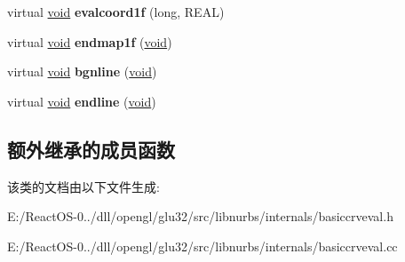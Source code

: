 \begin{DoxyCompactItemize}
virtual \hyperlink{interfacevoid}{void} {\bfseries evalcoord1f} (long, R\+E\+AL)
\item 
\mbox{\label{class_basic_curve_evaluator_a00b86103abe2972929dc866bbbdee913}} 
virtual \hyperlink{interfacevoid}{void} {\bfseries endmap1f} (\hyperlink{interfacevoid}{void})
\item 
\mbox{\label{class_basic_curve_evaluator_af9eea97e08fe3dd5e07445f3e1f8d16d}} 
virtual \hyperlink{interfacevoid}{void} {\bfseries bgnline} (\hyperlink{interfacevoid}{void})
\item 
\mbox{\label{class_basic_curve_evaluator_ad845296efb76e4317e855787e9e43c6a}} 
virtual \hyperlink{interfacevoid}{void} {\bfseries endline} (\hyperlink{interfacevoid}{void})
\end{DoxyCompactItemize}
\subsection*{额外继承的成员函数}


该类的文档由以下文件生成\+:\begin{DoxyCompactItemize}
\item 
E\+:/\+React\+O\+S-\/0../dll/opengl/glu32/src/libnurbs/internals/basiccrveval.\+h\item 
E\+:/\+React\+O\+S-\/0../dll/opengl/glu32/src/libnurbs/internals/basiccrveval.\+cc\end{DoxyCompactItemize}
